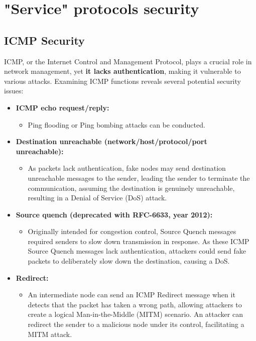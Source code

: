 \section{"Service" protocols security}
\subsection{ICMP Security}

ICMP, or the Internet Control and Management Protocol, plays a crucial role in network management, yet \textbf{it lacks authentication}, making it vulnerable to various attacks. Examining ICMP functions reveals several potential security issues:

\begin{itemize}
	\item \textbf{ICMP echo request/reply:}
	      \begin{itemize}
		      \item Ping flooding or Ping bombing attacks can be conducted.
	      \end{itemize}

	\item \textbf{Destination unreachable (network/host/protocol/port unreachable):}
	      \begin{itemize}
		      \item As packets lack authentication, fake nodes may send destination unreachable messages to the sender, leading the sender to terminate the communication, assuming the destination is genuinely unreachable, resulting in a Denial of Service (DoS) attack.
	      \end{itemize}

	\item \textbf{Source quench (deprecated with RFC-6633, year 2012):}
	      \begin{itemize}
		      \item Originally intended for congestion control, Source Quench messages required senders to slow down transmission in response. As these ICMP Source Quench messages lack authentication, attackers could send fake packets to deliberately slow down the destination, causing a DoS.
	      \end{itemize}

	\item \textbf{Redirect:}
	      \begin{itemize}
		      \item An intermediate node can send an ICMP Redirect message when it detects that the packet has taken a wrong path, allowing attackers to create a logical Man-in-the-Middle (MITM) scenario. An attacker can redirect the sender to a malicious node under its control, facilitating a MITM attack.
	      \end{itemize}


\end{itemize}
